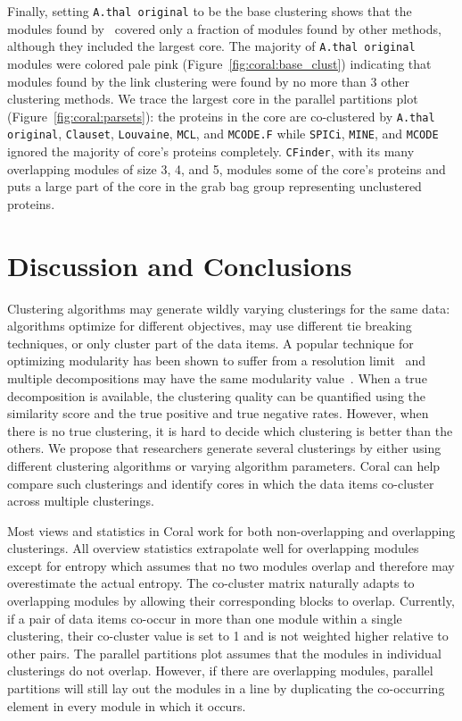 \documentclass[12pt]{cmuthesis}
\newcommand\Coral{Coral\xspace}
\begin{document}

  Finally, setting \texttt{A.thal original} to be the base clustering shows that the modules found by~\cite{Vidal2011} covered only a fraction of modules found by other methods, although they included the largest core. The majority of \texttt{A.thal original} modules were colored pale pink  (Figure~\ref{fig:coral:base_clust}) indicating that modules found by the link clustering were found by no more than 3 other clustering methods. We trace the largest core in the parallel partitions plot (Figure~\ref{fig:coral:parsets}): the proteins in the core are co-clustered by \texttt{A.thal original}, \texttt{Clauset}, \texttt{Louvaine}, \texttt{MCL}, and \texttt{MCODE.F} while \texttt{SPICi}, \texttt{MINE}, and \texttt{MCODE} ignored the majority of core's proteins completely. \texttt{CFinder}, with its many overlapping modules of size 3, 4, and 5, modules some of the core's proteins and puts a large part of the core in the grab bag group representing unclustered proteins.

\section{Discussion and Conclusions}

  Clustering algorithms may generate wildly varying clusterings for the same data: algorithms optimize for different objectives, may use different tie breaking techniques, or only cluster part of the data items. A popular technique for optimizing modularity has been shown to suffer from a resolution limit~\cite{Fortunato2006} and multiple decompositions may have the same modularity value~\cite{Duggal2010}. When a true decomposition is available, the clustering quality can be quantified using the similarity score and the true positive and true negative rates. However, when there is no true clustering, it is hard to decide which clustering is better than the others. We propose that researchers generate several clusterings by either using different clustering algorithms or varying algorithm parameters. \Coral can help compare such clusterings and identify cores in which the data items co-cluster across multiple clusterings.

  Most views and statistics in \Coral work for both non-overlapping and overlapping clusterings. All overview statistics extrapolate well for overlapping modules except for entropy which assumes that no two modules overlap and therefore may overestimate the actual entropy. The co-cluster matrix naturally adapts to overlapping modules by allowing their corresponding blocks to overlap. Currently, if a pair of data items co-occur in more than one module within a single clustering, their co-cluster value is set to 1 and is not weighted higher relative to other pairs. The parallel partitions plot assumes that the modules in individual clusterings do not overlap. However, if there are overlapping modules, parallel partitions will still lay out the modules in a line by duplicating the co-occurring element in every module in which it occurs.
\end{document}
